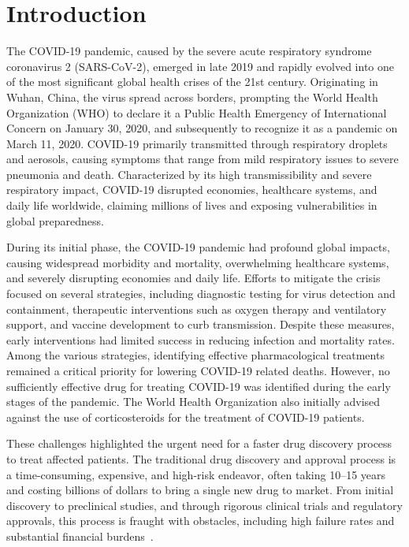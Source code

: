 \documentclass[Minh_PhD_thesis.tex]{subfiles}
\begin{document}
\section{Introduction}
\label{chap:Introduction}

The COVID-19 pandemic, caused by the severe acute respiratory syndrome coronavirus 2 (SARS-CoV-2), emerged in late 2019 and rapidly evolved into one of the most significant global health crises of the 21st century. Originating in Wuhan, China, the virus spread across borders, prompting the World Health Organization (WHO) to declare it a Public Health Emergency of International Concern on January 30, 2020, and subsequently to recognize it as a pandemic on March 11, 2020. 
COVID-19 primarily transmitted through respiratory droplets and aerosols, causing symptoms that range from mild respiratory issues to severe pneumonia and death. 
Characterized by its high transmissibility and severe respiratory impact, COVID-19 disrupted economies, healthcare systems, and daily life worldwide, claiming millions of lives and exposing vulnerabilities in global preparedness.

During its initial phase, the COVID-19 pandemic had profound global impacts, causing widespread morbidity and mortality, overwhelming healthcare systems, and severely disrupting economies and daily life. Efforts to mitigate the crisis focused on several strategies, including diagnostic testing for virus detection and containment, therapeutic interventions such as oxygen therapy and ventilatory support, and vaccine development to curb transmission. Despite these measures, early interventions had limited success in reducing infection and mortality rates. Among the various strategies, identifying effective pharmacological treatments remained a critical priority for lowering COVID-19 related deaths. However, no sufficiently effective drug for treating COVID-19 was identified during the early stages of the pandemic. The World Health Organization also initially advised against the use of corticosteroids for the treatment of COVID-19 patients.

These challenges highlighted the urgent need for a faster drug discovery process to treat affected patients. %
The traditional drug discovery and approval process is a time-consuming, expensive, and high-risk endeavor, often taking 10--15 years and costing billions of dollars to bring a single new drug to market. From initial discovery to preclinical studies, and through rigorous clinical trials and regulatory approvals, this process is fraught with obstacles, including high failure rates and substantial financial burdens~\cite{adams2006estimating, dickson2009cost, dimasi2003price}.
\end{document}
